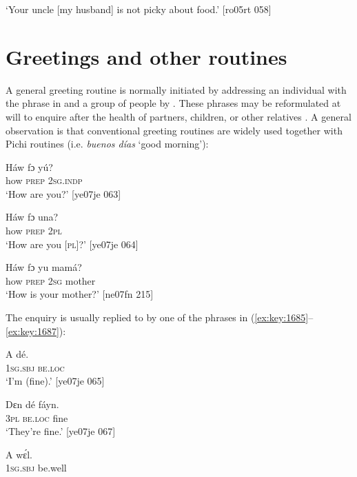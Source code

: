 \glt ‘Your uncle [my husband] is not picky about food.’ [ro05rt 058]
\z

\section{Greetings and other routines}\label{sec:12.4}

A general greeting routine is normally initiated by addressing an individual with the phrase in  and a group of people by . These phrases may be reformulated at will to enquire after the health of partners, children, or other relatives . A general observation is that conventional  greeting routines are widely used together with Pichi routines (i.e. \textit{buenos días} ‘good morning’):


\ea%
    \label{ex:key:1682}
    \gll Háw    fɔ  yú?\\
how    \textsc{prep}  \textsc{2sg.indp}\\

\glt ‘How are you?’ [ye07je 063]
\z


\ea%
    \label{ex:key:1683}
    \gll Háw    fɔ  una?\\
how    \textsc{prep}  \textsc{2pl}\\

\glt ‘How are you [\textsc{pl}]?’ [ye07je 064]
\z


\ea%
    \label{ex:key:1684}
    \gll Háw    fɔ  yu  mamá?\\
how    \textsc{prep}  \textsc{2sg}  mother\\

\glt ‘How is your mother?’ [ne07fn 215]
\z

The enquiry is usually replied to by one of the phrases in (\ref{ex:key:1685}–\ref{ex:key:1687}):


\ea%
    \label{ex:key:1685}
    \gll A    dé.\\
\textsc{1sg.sbj}  \textsc{be.loc}\\

\glt ‘I’m (fine).’ [ye07je 065]
\z


\ea%
    \label{ex:key:1686}
    \gll Dɛn  dé    fáyn.\\
\textsc{3pl}  \textsc{be.loc}  fine\\

\glt ‘They’re fine.’ [ye07je 067]
\z


\ea%
    \label{ex:key:1687}
    \gll A    wɛ́l.\\
\textsc{1sg.sbj}  be.well\\

